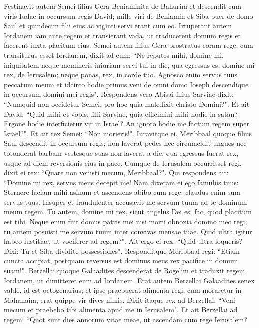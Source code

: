 \begin{biblechapter}
\verse Festinavit autem Semei filius Gera Beniaminita de Bahurim et descendit cum viris Iudae in occursum regis David; 
\verse mille viri de Beniamin et Siba puer de domo Saul et quindecim filii eius ac viginti servi erant cum eo. Irruperant autem Iordanem iam ante regem 
\verse et transierant vada, ut traducerent domum regis et facerent iuxta placitum eius. Semei autem filius Gera prostratus coram rege, cum transiturus esset Iordanem, 
\verse dixit ad eum: “Ne reputes mihi, domine mi, iniquitatem neque memineris iniuriam servi tui in die, qua egressus es, domine mi rex, de Ierusalem; neque ponas, rex, in corde tuo. 
\verse Agnosco enim servus tuus peccatum meum et idcirco hodie primus veni de omni domo Ioseph descendique in occursum domini mei regis". 
\verse Respondens vero Abisai filius Sarviae dixit: “Numquid non occidetur Semei, pro hoc quia maledixit christo Domini?". 
\verse Et ait David: “Quid mihi et vobis, filii Sarviae, quia efficimini mihi hodie in satan? Ergone hodie interficietur vir in Israel? An ignoro hodie me factum regem super Israel?". 
\verse Et ait rex Semei: “Non morieris!". Iuravitque ei. 
\verse Meribbaal quoque filius Saul descendit in occursum regis; non laverat pedes nec circumcidit ungues nec totonderat barbam vestesque suas non laverat a die, qua egressus fuerat rex, usque ad diem reversionis eius in pace. 
\verse Cumque de Ierusalem occurrisset regi, dixit ei rex: “Quare non venisti mecum, Meribbaal?". 
\verse Qui respondens ait: “Domine mi rex, servus meus decepit me! Nam dixeram ei ego famulus tuus: Sternere faciam mihi asinum et ascendens abibo cum rege; claudus enim sum servus tuus. 
\verse Insuper et fraudulenter accusavit me servum tuum ad te dominum meum regem. Tu autem, domine mi rex, sicut angelus Dei es; fac, quod placitum est tibi. 
\verse Neque enim fuit domus patris mei nisi morti obnoxia domino meo regi; tu autem posuisti me servum tuum inter convivas mensae tuae. Quid ultra igitur habeo iustitiae, ut vociferer ad regem?". 
\verse Ait ergo ei rex: “Quid ultra loqueris? Dixi: Tu et Siba dividite possessiones". 
\verse Responditque Meribbaal regi: “Etiam cuncta accipiat, postquam reversus est dominus meus rex pacifice in domum suam!". 
\verse Berzellai quoque Galaadites descenderat de Rogelim et traduxit regem Iordanem, ut dimitteret eum ad Iordanem. 
\verse Erat autem Berzellai Galaadites senex valde, id est octogenarius; et ipse praebuerat alimenta regi, cum moraretur in Mahanaim; erat quippe vir dives nimis. 
\verse Dixit itaque rex ad Berzellai: “Veni mecum et praebebo tibi alimenta apud me in Ierusalem". 
\verse Et ait Berzellai ad regem: “Quot sunt dies annorum vitae meae, ut ascendam cum rege Ierusalem? 

\end{biblechapter}
